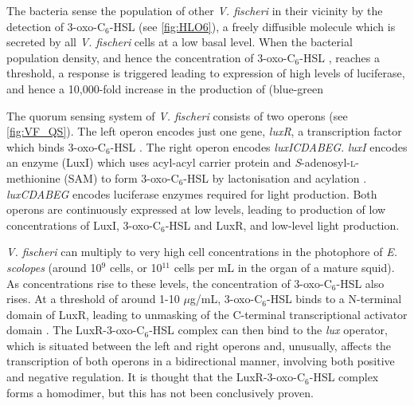 The bacteria sense the population of other \textit{V. fischeri} in their vicinity by the detection of 3-oxo-C$_6$-HSL \cite{Eberhard1981} (see \ref{fig:HLO6}), a freely diffusible\cite{Kaplan1985} molecule which is secreted by all \textit{V. fischeri} cells\cite{Schaefer1996} at a low basal level\cite{Miller2001}. When the bacterial population density, and hence the concentration of 3-oxo-C$_6$-HSL , reaches a threshold, a response is triggered leading to expression of high levels of luciferase, and hence a 10,000-fold\cite{Devine1989} increase in the production of (blue-green%

The quorum sensing system of \textit{V. fischeri} consists of two operons (see \ref{fig:VF_QS}). The left operon encodes just one gene, \textit{luxR}, a transcription factor which binds 3-oxo-C$_6$-HSL . The right operon encodes \textit{luxICDABEG}. \textit{luxI} encodes an enzyme (LuxI) which uses acyl-acyl carrier protein and \textit{S}-adenosyl-\textsc{l}-methionine (SAM) to form 3-oxo-C$_6$-HSL  by lactonisation and acylation \cite{Parsek1999, Watson2002}. \textit {luxCDABEG} encodes luciferase enzymes required for light production. Both operons are continuously expressed at low levels, leading to production of low concentrations of LuxI, 3-oxo-C$_6$-HSL  and LuxR, and low-level light production\cite{Engebrecht1983}. 

\textit{V. fischeri} can multiply to very high cell concentrations in the photophore of \textit{E. scolopes} (around 10$^9$ cells\cite{Ruby1993, Ruby1998, Nyholm1998}, or 10$^{11}$ cells per mL \cite{Miller2001} in the organ of a mature squid). As concentrations rise to these levels, the concentration of 3-oxo-C$_6$-HSL  also rises. At a threshold of around 1-10 $\mu$g/mL\cite{Eberhard1981}, 3-oxo-C$_6$-HSL  binds to a N-terminal domain of LuxR\cite{Hanzelka1995}, leading to unmasking of the C-terminal transcriptional activator domain \cite{Choi1991,Choi1992}. The LuxR-3-oxo-C$_6$-HSL complex can then bind to the \textit{lux} operator, which is situated between the left and right operons and, unusually, affects the transcription of both operons in a bidirectional manner, involving both positive and negative regulation\cite{Shadel1991}. It is thought that the LuxR-3-oxo-C$_6$-HSL complex forms a homodimer\cite{Choi1992a}, but this has not been conclusively proven\cite{Antunes2008,Miyashiro2012}.

